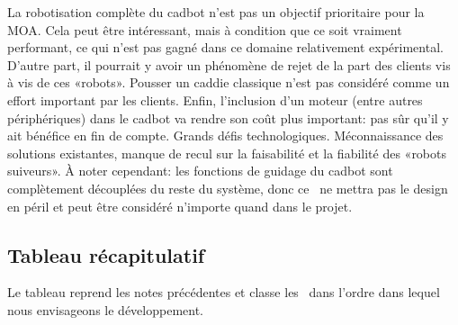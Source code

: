 \startnote
{} La robotisation complète du cadbot n'est pas un objectif prioritaire pour la MOA.
Cela peut être intéressant, mais à condition que ce soit vraiment performant, ce qui n'est pas gagné dans ce domaine relativement expérimental. 
D'autre part, il pourrait y avoir un phénomène de rejet de la part des clients vis à vis de ces «robots».
Pousser un caddie classique n'est pas considéré comme un effort important par les clients.
Enfin, l'inclusion d'un moteur (entre autres périphériques) dans le cadbot va rendre son coût plus important: pas sûr qu'il y ait bénéfice en fin de compte.
 Grands défis technologiques. Méconnaissance des solutions existantes, manque de recul sur la faisabilité et la fiabilité des «robots suiveurs». 
À noter cependant: les fonctions de guidage du cadbot sont complètement découplées du reste du système, donc ce \cu\ ne mettra pas le design en péril et peut être considéré n'importe quand dans le projet.
\stopnote





\subsection{Tableau récapitulatif}

Le tableau \in[CLASSEMENT] reprend les notes précédentes et classe les \cu\ dans l'ordre dans lequel nous envisageons le développement.
    
